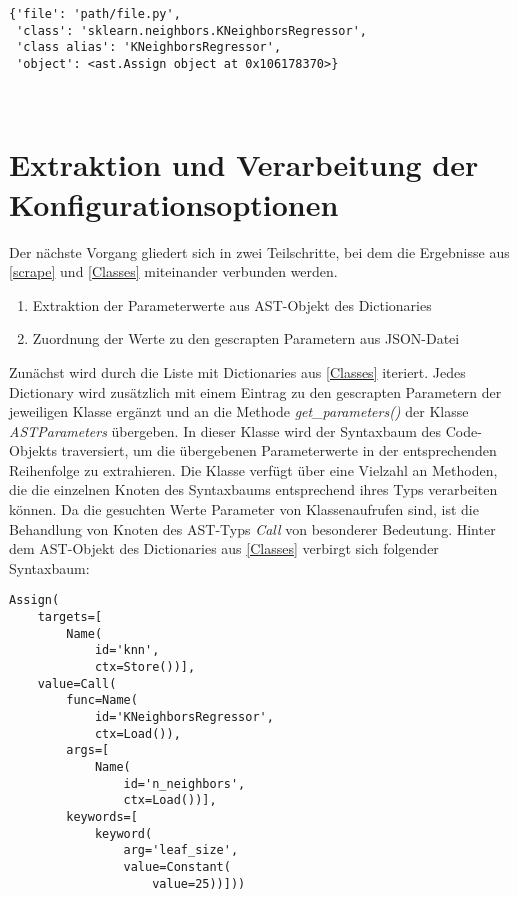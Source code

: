 \documentclass[german,bachelor]{swsLeipzig}
\begin{document}
\begin{lstlisting}[frame=single, basicstyle=\small]
{'file': 'path/file.py',
 'class': 'sklearn.neighbors.KNeighborsRegressor',
 'class alias': 'KNeighborsRegressor',
 'object': <ast.Assign object at 0x106178370>}
\end{lstlisting}
\

\section{Extraktion und Verarbeitung der Konfigurationsoptionen} \label{Parameters}
Der nächste Vorgang gliedert sich in zwei Teilschritte, bei dem die Ergebnisse aus \ref{scrape} und \ref{Classes} miteinander
verbunden werden.

\begin{enumerate}
 \item Extraktion der Parameterwerte aus AST-Objekt des Dictionaries
 \item Zuordnung der Werte zu den gescrapten Parametern aus JSON-Datei
\end{enumerate}

Zunächst wird durch die Liste mit Dictionaries aus \ref{Classes} iteriert.
Jedes Dictionary wird zusätzlich mit einem Eintrag zu den gescrapten Parametern der jeweiligen Klasse ergänzt und an die Methode \textit{get\_parameters()}
der Klasse \textit{ASTParameters} übergeben.
In dieser Klasse wird der Syntaxbaum des Code-Objekts traversiert, um die übergebenen Parameterwerte in der
entsprechenden Reihenfolge zu extrahieren.
Die Klasse verfügt über eine Vielzahl an Methoden, die die einzelnen Knoten des Syntaxbaums entsprechend ihres Typs
verarbeiten können.
Da die gesuchten Werte Parameter von Klassenaufrufen sind, ist die Behandlung von Knoten des AST-Typs \textit{Call} von
besonderer Bedeutung.
Hinter dem AST-Objekt des Dictionaries aus \ref{Classes} verbirgt sich folgender Syntaxbaum: \\

\begin{lstlisting}[frame=single, basicstyle=\small]
Assign(
    targets=[
        Name(
            id='knn',
            ctx=Store())],
    value=Call(
        func=Name(
            id='KNeighborsRegressor',
            ctx=Load()),
        args=[
            Name(
                id='n_neighbors',
                ctx=Load())],
        keywords=[
            keyword(
                arg='leaf_size',
                value=Constant(
                    value=25))]))
\end{lstlisting}
\
\end{document}
